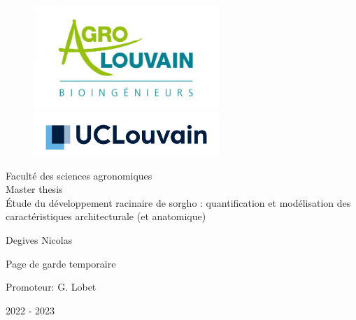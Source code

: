 \begin{titlepage}
    \selectfont
    \bfseries
    \begin{center}
    \begin{figure}[!ht]
       \begin{minipage}{0.48\textwidth}
        \includegraphics[width=7cm]{Logo/agro-louvain.jpg}
       \end{minipage}\hfill
       \begin{minipage}{0.48\textwidth}
        \centering
        \includegraphics[width=7cm]{Logo/UCLouvain.png}
        \end{minipage}
        \end{figure}
    
    {\LARGE Faculté des sciences agronomiques}\\[1cm]
    
    {\Large Master thesis}\\[1.5cm]
    \vspace{0.4cm}
    { \huge Étude du développement racinaire de sorgho : quantification et modélisation des caractéristiques architecturale (et anatomique)}
    \vspace{0.4cm}
        
        
    \vspace{2cm}
    Degives Nicolas
    
    \vspace{1cm}
    Page de garde temporaire
    
    \vspace{1.5cm}
    Promoteur: G. Lobet
    
    \vspace{1.5cm}
    {\large 2022 - 2023}
  \end{center}
\end{titlepage}
\newpage

















